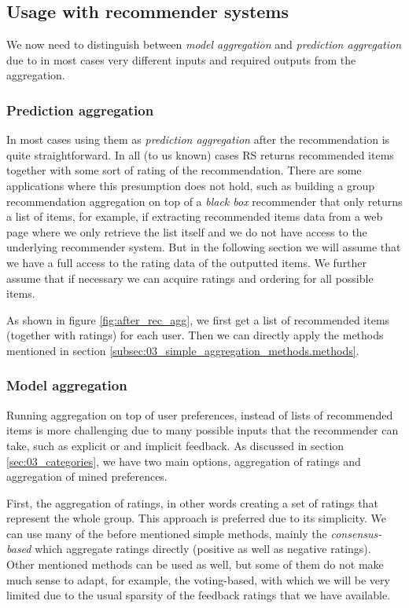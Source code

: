 \subsection{Usage with recommender systems}
We now need to distinguish between \textit{model aggregation} and \textit{prediction aggregation} due to in most cases very different inputs and required outputs from the aggregation.
\subsubsection{Prediction aggregation}
In most cases using them as \textit{prediction aggregation} after the recommendation is quite straightforward. In all (to us known) cases RS returns recommended items together with some sort of rating of the recommendation. There are some applications where this presumption does not hold, such as building a group recommendation aggregation on top of a \textit{black box} recommender that only returns a list of items, for example, if extracting recommended items data from a web page where we only retrieve the list itself and we do not have access to the underlying recommender system. But in the following section we will assume that we have a full access to the rating data of the outputted items. We further assume that if necessary we can acquire ratings and ordering for all possible items.

As shown in figure \ref{fig:after_rec_agg}, we first get a list of recommended items (together with ratings) for each user. Then we can directly apply the methods mentioned in section \ref{subsec:03_simple_aggregation_methods.methods}.

\subsubsection{Model aggregation}
Running aggregation on top of user preferences, instead of lists of recommended items is more challenging due to many possible inputs that the recommender can take, such as explicit or and implicit feedback. As discussed in section \ref{sec:03_categories}, we have two main options, aggregation of ratings and aggregation of mined preferences.

First, the aggregation of ratings, in other words creating a set of ratings that represent the whole group. This approach is preferred due to its simplicity. We can use many of the before mentioned simple methods, mainly the \textit{consensus-based} which aggregate ratings directly (positive as well as negative ratings). Other mentioned methods can be used as well, but some of them do not make much sense to adapt, for example, the voting-based, with which we will be very limited due to the usual sparsity of the feedback ratings that we have available.

